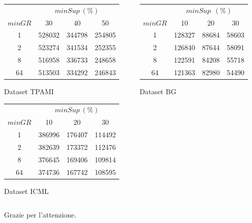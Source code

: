\documentclass{beamer}
\begin{document}
\begin{frame}
\begin{scriptsize}

\begin{columns}
\begin{column}{0.4\textwidth}
	\begin{tabular}{c | ccc}
	\toprule
	 & \multicolumn{3}{c}{$minSup\ (\%)$} \\
	$minGR$ & 30 & 40 & 50 \\
	\hline
	1  & 528032 & 344798 & 254805 \\
	2  & 523274 & 341534 & 252355 \\
	8  & 516958 & 336733 & 248658 \\
	64 & 513503 & 334292 & 246843 \\
	\bottomrule
	\end{tabular}
Dataset TPAMI
	\vspace{8 mm}
	
	\begin{tabular}{c | ccc}
	\toprule
	 & \multicolumn{3}{c}{$minSup\ (\%)$} \\
	$minGR$ & 10 & 20 & 30 \\
	\hline
	1  & 386996 & 176407 & 114492 \\
	2  & 382639 & 173372 & 112476 \\
	8  & 376645 & 169406 & 109814 \\
	64 & 374736 & 167742 & 108595 \\
	\bottomrule
	\end{tabular}
Dataset ICML

\end{column}

\begin{column}{0.4\textwidth}
	\begin{tabular}{c | ccc}
	\toprule
	 & \multicolumn{3}{c}{$minSup\ \ (\%)$} \\
	$minGR$ & 10 & 20 & 30 \\
	\hline
	1  & 128327 & 88684 & 58603 \\
	2  & 126840 & 87644 & 58091 \\
	8  & 122591 & 84208 & 55718 \\
	64 & 121363 & 82980 & 54490 \\
	\bottomrule
	\end{tabular}
Dataset BG

\end{column}
\end{columns}

\end{scriptsize}
\end{frame}


\begin{frame}
\begin{center}
Grazie per l'attenzione.
\end{center}
\end{frame}
\end{document}
